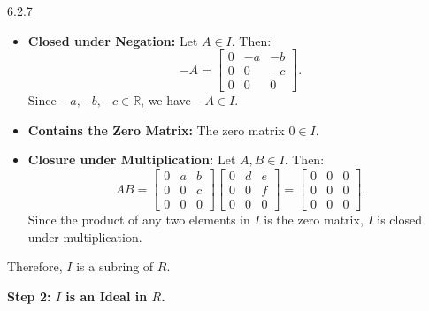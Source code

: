 \documentclass[12pt]{amsart}
\theoremstyle{definition}
\numberwithin{equation}{section}
\newcommand{\R}{\mathbb{R}}
\begin{document}
\begin{exercise}{6.2.7}
\begin{itemize}
        \item \textbf{Closed under Negation:}
        Let \(A \in I\). Then:
        \[
        -A = \begin{bmatrix} 0 & -a & -b \\ 0 & 0 & -c \\ 0 & 0 & 0 \end{bmatrix}.
        \]
        Since \(-a, -b, -c \in \R \), we have \(-A \in I\).

        \item \textbf{Contains the Zero Matrix:}
        The zero matrix \(0 \in I\).

        \item \textbf{Closure under Multiplication:}
        Let \(A, B \in I\). Then:
        \[
        AB = \begin{bmatrix} 0 & a & b \\ 0 & 0 & c \\ 0 & 0 & 0 \end{bmatrix} \begin{bmatrix} 0 & d & e \\ 0 & 0 & f \\ 0 & 0 & 0 \end{bmatrix} = \begin{bmatrix} 0 & 0 & 0 \\ 0 & 0 & 0 \\ 0 & 0 & 0 \end{bmatrix}.
        \]
        Since the product of any two elements in \(I\) is the zero matrix, \(I\) is closed under multiplication.
    \end{itemize}

    Therefore, \(I\) is a subring of \(R\).

    \noindent \textbf{Step 2: \(I\) is an Ideal in \(R\).}


\end{exercise}
\end{document}
